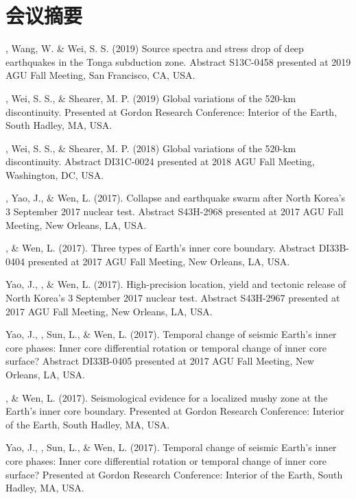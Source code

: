 \section*{会议摘要}
\begin{etaremune}
\item \Tian, Wang, W. \& Wei, S. S. (2019)
	Source spectra and stress drop of deep earthquakes in the Tonga subduction zone.
	Abstract S13C-0458 presented at 2019 AGU Fall Meeting, San Francisco, CA, USA.
\item
    \Tian, Wei, S. S., \& Shearer, M. P. (2019)
    Global variations of the 520-km discontinuity.
    Presented at Gordon Research Conference: Interior of the Earth, South Hadley, MA, USA.
\item
    \Tian, Wei, S. S., \& Shearer, M. P. (2018)
    Global variations of the 520-km discontinuity.
    Abstract DI31C-0024 presented at 2018 AGU Fall Meeting, Washington, DC, USA.
\item
    \Tian, Yao, J., \& Wen, L. (2017).
    Collapse and earthquake swarm after North Korea's 3 September 2017 nuclear test.
    Abstract S43H-2968 presented at 2017 AGU Fall Meeting, New Orleans, LA, USA.
\item
    \Tian, \& Wen, L. (2017).
    Three types of Earth's inner core boundary.
    Abstract DI33B-0404 presented at 2017 AGU Fall Meeting, New Orleans, LA, USA.
\item
    Yao, J., \Tian, \& Wen, L. (2017).
    High-precision location, yield and tectonic release of North Korea's 3 September 2017 nuclear test.
    Abstract S43H-2967 presented at 2017 AGU Fall Meeting, New Orleans, LA, USA.
\item
    Yao, J., \Tian, Sun, L., \& Wen, L. (2017).
    Temporal change of seismic Earth's inner core phases: Inner core differential rotation or temporal change of inner core surface?
    Abstract DI33B-0405 presented at 2017 AGU Fall Meeting, New Orleans, LA, USA.
\item
    \Tian, \& Wen, L. (2017).
    Seismological evidence for a localized mushy zone at the Earth's inner core boundary.
    Presented at Gordon Research Conference: Interior of the Earth, South Hadley, MA, USA.
\item
    Yao, J., \Tian, Sun, L., \& Wen, L. (2017).
    Temporal change of seismic Earth's inner core phases: Inner core differential rotation or temporal change of inner core surface?
    Presented at Gordon Research Conference: Interior of the Earth, South Hadley, MA, USA.
\item

\end{etaremune}
